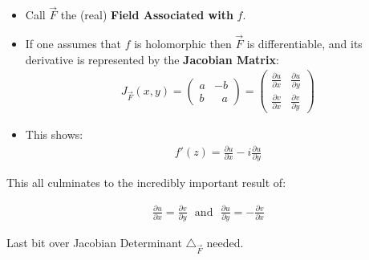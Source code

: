 \begin{itemize}
		\item Call $\vec{F}$ the (real) \textbf{Field Associated with} $f.$ 
		\item If one assumes that $f$ is holomorphic then $\vec{F}$ is differentiable, and its derivative is represented by the \textbf{Jacobian Matrix}:
		\begin{align*}
			J_{\vec{F}}(x, y) = \left( \begin{matrix}
				a & -b \\
				b &\,\,\,\,  a 
			\end{matrix}
			\right)
			= \left( \begin{matrix}
				\frac{\partial u}{\partial x} & \frac{\partial u}{\partial y} \\
				\frac{\partial v}{\partial x} & \frac{\partial v}{\partial y}
			\end{matrix} \right)
		\end{align*}
		\item This shows:
		\begin{align*}
			f'(z) = \frac{\partial u}{\partial x} - i\frac{\partial u}{\partial y}
		\end{align*}
\end{itemize}
This all culminates to the incredibly important result of:
\begin{defn}
	\begin{align*}
		\frac{\partial u}{\partial x} = \frac{\partial v}{\partial y} \,\,\,\, \text{and} \,\,\,\, \frac{\partial u}{\partial y} = -\frac{\partial v}{\partial x}
	\end{align*}	
\end{defn}


Last bit over Jacobian Determinant $\triangle_{\vec{F}}$ needed.

\newpage